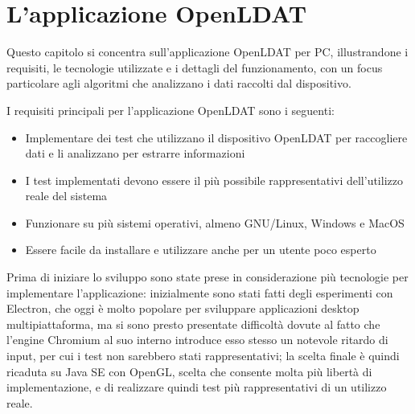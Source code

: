\chapter{L'applicazione OpenLDAT}
\label{chap:app}

Questo capitolo si concentra sull'applicazione OpenLDAT per PC, illustrandone i requisiti, le tecnologie utilizzate e i dettagli del funzionamento, con un focus particolare agli algoritmi che analizzano i dati raccolti dal dispositivo.

I requisiti principali per l'applicazione OpenLDAT sono i seguenti:
\begin{itemize}
	\item Implementare dei test che utilizzano il dispositivo OpenLDAT per raccogliere dati e li analizzano per estrarre informazioni
	\item I test implementati devono essere il più possibile rappresentativi dell'utilizzo reale del sistema
	\item Funzionare su più sistemi operativi, almeno GNU/Linux, Windows e MacOS
	\item Essere facile da installare e utilizzare anche per un utente poco esperto
\end{itemize}

Prima di iniziare lo sviluppo sono state prese in considerazione più tecnologie per implementare l'applicazione: inizialmente sono stati fatti degli esperimenti con Electron, che oggi è molto popolare per sviluppare applicazioni desktop multipiattaforma, ma si sono presto presentate difficoltà dovute al fatto che l'engine Chromium al suo interno introduce esso stesso un notevole ritardo di input, per cui i test non sarebbero stati rappresentativi; la scelta finale è quindi ricaduta su Java SE con OpenGL, scelta che consente molta più libertà di implementazione, e di realizzare quindi test più rappresentativi di un utilizzo reale.

